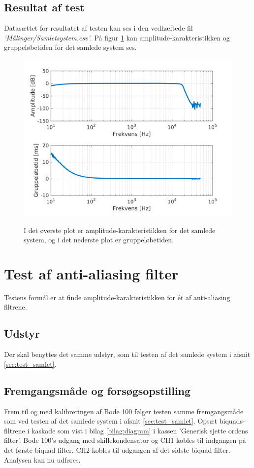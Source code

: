 \subsection{Resultat af test}
Datasættet for resultatet af testen kan ses i den vedhæftede fil \textit{'Målinger/Samlet\textunderscore system.csv'}. På figur \ref{fig:tf_tg_samletsystem} kan amplitude-karakteristikken og gruppeløbetiden for det samlede system ses.
\begin{figure}[h]
	\caption{I det øverste plot er amplitude-karakteristikken for det samlede system, og i det nederste plot er gruppeløbetiden.}
	\includegraphics[width=1\linewidth]{matlab/tf_tg_samletsystem.png}
	\label{fig:tf_tg_samletsystem}
\end{figure}

\section{Test af anti-aliasing filter}
\label{sec:test_aafilter}
Testens formål er at finde amplitude-karakteristikken for ét af anti-aliasing filtrene. 

\subsection{Udstyr}
Der skal benyttes det samme udstyr, som til testen af det samlede system i afsnit \ref{sec:test_samlet}.

\subsection{Fremgangsmåde og forsøgsopstilling}
Frem til og med kalibreringen af Bode 100 følger testen samme fremgangsmåde som ved testen af det samlede system i afsnit \ref{sec:test_samlet}. \newline
Opsæt biquads-filtrene i kaskade som vist i bilag \ref{bilag:diagram} i kassen 'Generisk sjette ordens filter'. 
Bode 100's udgang med skillekondensator og CH1 kobles til indgangen på det første biquad filter. 
CH2 kobles til udgangen af det sidste biquad filter. \newline
Analysen kan nu udføres. 

